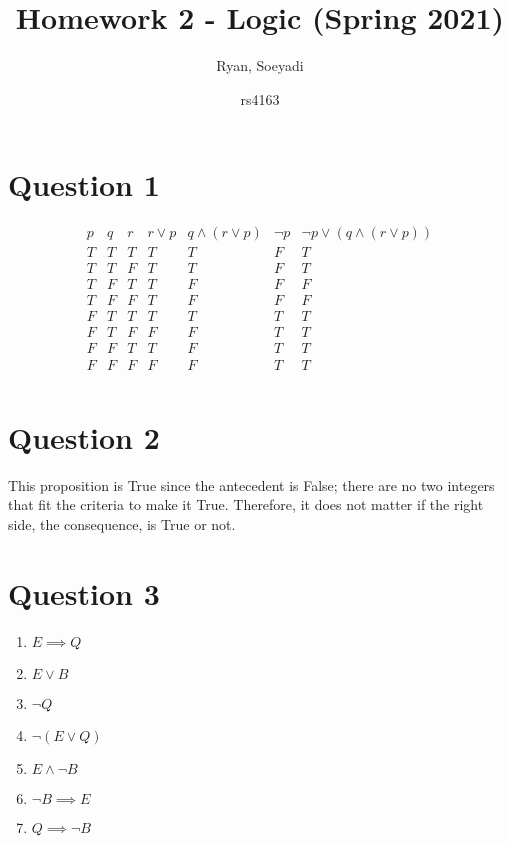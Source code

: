 \documentclass{article}
\title{Homework 2 - Logic (Spring 2021)}
\author
{
Ryan, Soeyadi
\and rs4163
}
\begin{document}
    \maketitle
    
    \section*{Question 1}
    \begin{displaymath}
    \begin{array}{|c|c|c|c|c|c|c|}
    
    p & q & r & r \lor p & q \land (r \lor p) & \neg p & \neg p \lor (q \land (r \lor p)) \\
    \hline
    T & T & T & T & T & F & T \\
    T & T & F & T & T & F & T \\
    T & F & T & T & F & F & F \\
    T & F & F & T & F & F & F \\
    F & T & T & T & T & T & T \\
    F & T & F & F & F & T & T \\
    F & F & T & T & F & T & T \\
    F & F & F & F & F & T & T \\
    \end{array}
    \end{displaymath}
    \newpage
    \section*{Question 2}
     This proposition is True since the antecedent is False; there are no two integers that fit the criteria to make it True. Therefore, it does not matter if the right side, the consequence, is True or not.
    \newpage
    \section*{Question 3}
    \begin{enumerate}
    \item $E \implies Q$ \\
    \item $E \lor B$ \\
    \item $\neg Q$ \\
    \item $\neg (E \lor Q)$ \\
    \item $E \land \neg B$ \\
    \item $\neg B \implies E$ \\
    \item $Q \implies \neg B$
    \end{enumerate}
    \newpage
\end{document}
